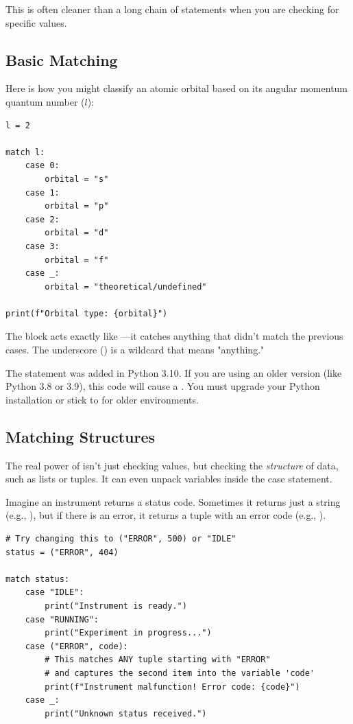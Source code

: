 This is often cleaner than a long chain of  statements when you are checking for specific values.

\subsection{Basic Matching}

Here is how you might classify an atomic orbital based on its angular momentum quantum number ($l$):

\begin{lstlisting}
l = 2

match l:
    case 0:
        orbital = "s"
    case 1:
        orbital = "p"
    case 2:
        orbital = "d"
    case 3:
        orbital = "f"
    case _:
        orbital = "theoretical/undefined"

print(f"Orbital type: {orbital}")
\end{lstlisting}

The  block acts exactly like ---it catches anything that didn't match the previous cases. The underscore (\py{_}) is a wildcard that means "anything."

\begin{warning}
The  statement was added in Python 3.10. If you are using an older version (like Python 3.8 or 3.9), this code will cause a . You must upgrade your Python installation or stick to  for older environments.
\end{warning}

\subsection{Matching Structures}

The real power of  isn't just checking values, but checking the \emph{structure} of data, such as lists or tuples. It can even unpack variables inside the case statement.

Imagine an instrument returns a status code. Sometimes it returns just a string (e.g., ), but if there is an error, it returns a tuple with an error code (e.g., ).

\begin{lstlisting}
# Try changing this to ("ERROR", 500) or "IDLE"
status = ("ERROR", 404) 

match status:
    case "IDLE":
        print("Instrument is ready.")
    case "RUNNING":
        print("Experiment in progress...")
    case ("ERROR", code):
        # This matches ANY tuple starting with "ERROR"
        # and captures the second item into the variable 'code'
        print(f"Instrument malfunction! Error code: {code}")
    case _:
        print("Unknown status received.")
\end{lstlisting}

